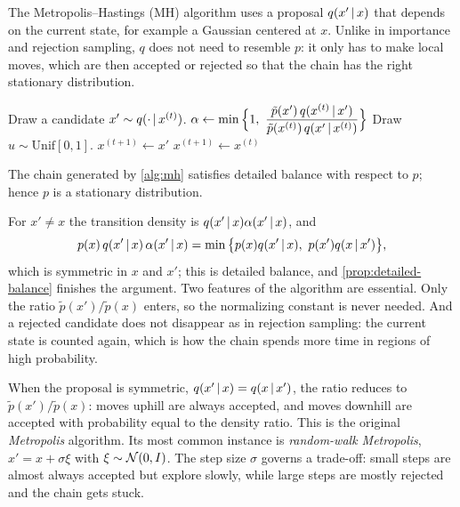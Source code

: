 The Metropolis--Hastings (MH) algorithm uses a proposal $q(x'\,|\, x)$ that depends on the current state, for example a Gaussian centered at $x$. Unlike in importance and rejection sampling, $q$ does not need to resemble $p$: it only has to make local moves, which are then accepted or rejected so that the chain has the right stationary distribution.

\begin{algorithm}[H]
\caption{Metropolis--Hastings}\label{alg:mh}
\begin{algorithmic}[1]
  \State Draw a candidate $x'\sim q(\cdot\,|\, x^{(t)})$.
  \State $\alpha\gets\min\Big\{1,\ \dfrac{\tilde p(x')\,q(x^{(t)}\given x')}{\tilde p(x^{(t)})\,q(x'\given x^{(t)})}\Big\}$ 
  \State Draw $u\sim\mathrm{Unif}[0,1]$.
    \State $x^{(t+1)}\gets x'$ 
  \Else
    \State $x^{(t+1)}\gets x^{(t)}$ 
  \EndIf
\EndFor
{}
\end{algorithmic}
\end{algorithm}

\begin{theorem}\label{thm:mh}
The chain generated by \cref{alg:mh} satisfies detailed balance with respect to $p$; hence $p$ is a stationary distribution.
\end{theorem}

For $x'\ne x$ the transition density is $q(x'\,|\, x)\alpha(x'\,|\, x)$, and
\[
p(x)\,q(x'\,|\, x)\,\alpha(x'\,|\, x)=\min\big\{p(x)q(x'\,|\, x),\ p(x')q(x\,|\, x')\big\},
\]
which is symmetric in $x$ and $x'$; this is detailed balance, and \cref{prop:detailed-balance} finishes the argument. Two features of the algorithm are essential. Only the ratio $\tilde p(x')/\tilde p(x)$ enters, so the normalizing constant is never needed. And a rejected candidate does not disappear as in rejection sampling: the current state is counted again, which is how the chain spends more time in regions of high probability.

When the proposal is symmetric, $q(x'\,|\, x)=q(x\,|\, x')$, the ratio reduces to $\tilde p(x')/\tilde p(x)$: moves uphill are always accepted, and moves downhill are accepted with probability equal to the density ratio. This is the original \emph{Metropolis} algorithm. Its most common instance is \emph{random-walk Metropolis}, $x'=x+\sigma\xi$ with $\xi\sim\mathcal{N}(0,I)$. The step size $\sigma$ governs a trade-off: small steps are almost always accepted but explore slowly, while large steps are mostly rejected and the chain gets stuck.

